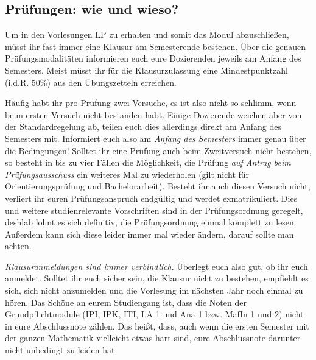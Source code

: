 \subsection{Prüfungen: wie und wieso?}

Um in den Vorlesungen \gls{LP} zu erhalten und somit das Modul abzuschließen, müsst ihr fast immer eine Klausur am Semesterende bestehen. Über die genauen Prüfungsmodalitäten informieren euch eure Dozierenden jeweils am Anfang des Semesters. Meist müsst ihr für die Klausurzulassung eine Mindestpunktzahl (i.d.R. 50\%) aus den Übungszetteln erreichen.

Häufig habt ihr pro Prüfung zwei Versuche, es ist also nicht so schlimm, wenn beim ersten Versuch nicht bestanden habt. Einige Dozierende weichen aber von der Standardregelung ab, teilen euch dies allerdings direkt am Anfang des Semesters mit. Informiert euch also am \emph{Anfang des Semesters} immer genau über die Bedingungen! Solltet ihr eine Prüfung auch beim Zweitversuch nicht bestehen, so besteht in bis zu vier Fällen die Möglichkeit, die Prüfung \emph{auf Antrag beim Prüfungsausschuss} ein weiteres Mal zu wiederholen (gilt nicht für Orientierungsprüfung und Bachelorarbeit). Besteht ihr auch diesen Versuch nicht, verliert ihr euren Prüfungsanspruch endgültig und werdet exmatrikuliert. Dies und weitere studienrelevante Vorschriften sind in der Prüfungsordnung geregelt, deshlab lohnt es sich definitiv, die Prüfungsordnung einmal komplett zu lesen. Außerdem kann sich diese leider immer mal wieder ändern, darauf sollte man achten.

\emph{Klausuranmeldungen sind immer verbindlich}. Überlegt euch also gut, ob ihr euch anmeldet. Solltet ihr euch sicher sein, die Klausur nicht zu bestehen, empfiehlt es sich, sich nicht anzumelden und die Vorlesung im nächsten Jahr noch einmal zu hören. Das Schöne an eurem Studiengang ist, dass die Noten der Grundpflichtmodule (\gls{IPI}, \gls{IPK}, \gls{ITI}, \gls{LA} 1 und \gls{Ana} 1 bzw. \gls{MafIn} 1 und 2) nicht in eure Abschlussnote zählen. Das heißt, dass, auch wenn die ersten Semester mit der ganzen Mathematik vielleicht etwas hart sind, eure Abschlussnote darunter nicht unbedingt zu leiden hat.

